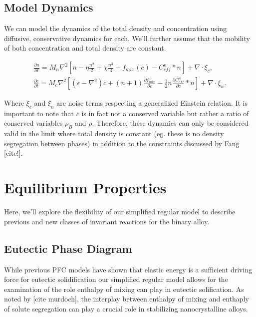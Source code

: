 \documentclass[showkeys, prb, reprint]{revtex4-1}
\newcommand{\B}{\rho_B}
\renewcommand{\l}{\left}
\renewcommand{\r}{\right}
\newcommand{\f}{\frac}
\begin{document}
\subsection{Model Dynamics}

We can model the dynamics of the total density and concentration using diffusive, conservative dynamics for each. We'll further assume that the mobility of both concentration and total density are constant. 

\begin{gather}
	\f{\partial n}{\partial t} = M_{n} \nabla^2 \l[n - \eta \f{n^2}{2} + \chi \f{n^3}{3} + f_{mix}(c) - C^n_{eff} \ast n \r] + \nabla \cdot\xi_c, \\
	\f{\partial c}{\partial t} = M_{c} \nabla^2 \l[\l(\epsilon - \nabla^2\r)c + \l(n + 1\r)\f{\partial f_{mix}}{\partial c} - \f{1}{2} n \f{\partial C^n_{eff}}{\partial c} \ast n\r] + \nabla \cdot \xi_n.
\end{gather}

Where $\xi_c$ and $\xi_n$ are noise terms respecting a generalized Einstein relation. It is important to note that $c$ is in fact not a conserved variable but rather a ratio of conserved variables $\B$ and $\rho$. Therefore, these dynamics can only be considered valid in the limit where total density is constant (eg. these is no density segregation between phases) in addition to the constraints discussed by Fang [cite!]. 

\section{Equilibrium Properties}

Here, we'll explore the flexibility of our simplified regular model to describe previous and new classes of invariant reactions for the binary alloy.

\subsection{Eutectic Phase Diagram}

While previous PFC models have shown that elastic energy is a sufficient driving force for eutectic solidification our simplified regular model allows for the examination of the role enthalpy of mixing can play in eutectic solification. As noted by [cite murdoch], the interplay between enthalpy of mixing and enthaply of solute segregation can play a crucial role in stabilizing nanocrystalline alloys.
\end{document}
